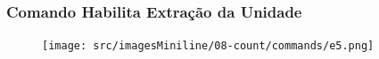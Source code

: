 \newpage
\thispagestyle{fancy}
\vspace*{40 pt}
\subsubsection{\small{Comando Habilita Extração da Unidade}}\label{miniTelaComandoContagemHabilitaExtracaoDaUnidade}
\vspace*{\fill}
\begin{figure}[h]
  \centering
  \texttt{[image: src/imagesMiniline/08-count/commands/e5.png]}
\end{figure}
\vspace*{\fill}